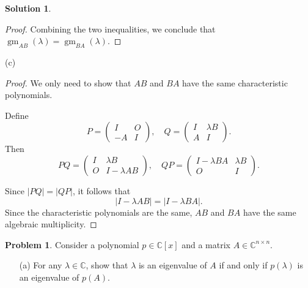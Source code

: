 \documentclass[12pt]{article}
\theoremstyle{definition}
\newtheorem*{solution}{\normalfont\textbf{Solution}}
\newtheorem*{Problem}{\noindent\textbf{Problem}}
\DeclareMathOperator{\gm}{gm}
\begin{document}
\begin{enumerate}[leftmargin=*]
\begin{solution}
\begin{proof}
                Combining the two inequalities, we conclude that \(\gm_{AB}(\lambda) = \gm_{BA}(\lambda)\).
                \end{proof}
            \item[(c)]
                \begin{proof}
                    We only need to show  that \(AB\) and \(BA\) have the same characteristic polynomials.

                    Define 
                    \[
                    P = \begin{pmatrix} I & O \\ -A & I \end{pmatrix}, \quad 
                    Q = \begin{pmatrix} I & \lambda B \\ A & I \end{pmatrix}.
                    \]
                    Then
                    \[
                    PQ = \begin{pmatrix} I & \lambda B \\ O & I - \lambda AB \end{pmatrix}, \quad 
                    QP = \begin{pmatrix} I - \lambda BA & \lambda B \\ O & I \end{pmatrix}.
                    \]

                    Since \( |PQ| = |QP| \), it follows that 
                    \[
                    |I - \lambda AB| = |I - \lambda BA|.
                    \]
                    Since the characteristic polynomials are the same, \(AB\) and \(BA\) have the same algebraic multiplicity.

                \end{proof}
        \end{solution}

    \item \begin{Problem}
            Consider a polynomial \( p \in \mathbb{C}[x] \) and a matrix \( A \in \mathbb{C}^{n \times n} \).
            \begin{enumerate}
                \item[(a)] For any \( \lambda \in \mathbb{C} \), show that \( \lambda \) is an eigenvalue of \( A \) if and only if \( p(\lambda) \) is an eigenvalue of \( p(A) \).


\end{enumerate}
\end{Problem}
\end{enumerate}
\end{document}
